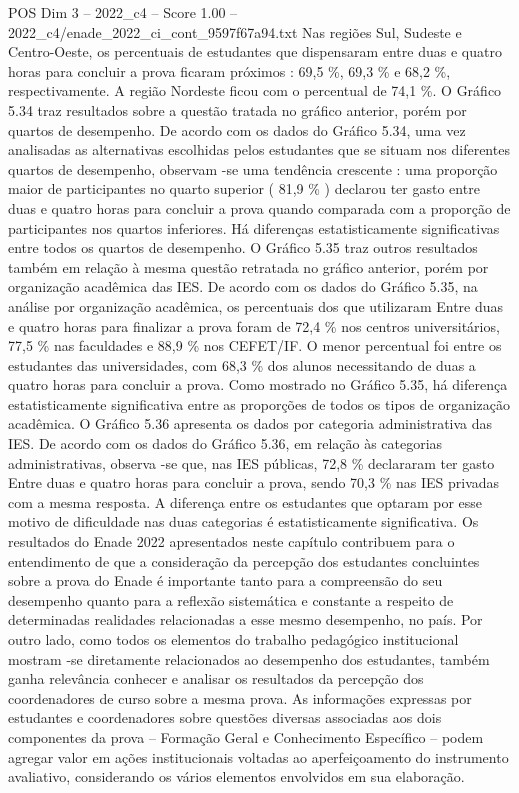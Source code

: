 \begin{textsample}{POS Dim 3 – 2022\_c4 – Score 1.00 – 2022\_c4/enade\_2022\_ci\_cont\_9597f67a94.txt}
Nas regiões Sul, Sudeste e Centro-Oeste, os percentuais de estudantes que dispensaram entre duas e quatro horas para concluir a prova ficaram próximos : 69,5 \%, 69,3 \% e 68,2 \%, respectivamente.
A região Nordeste ficou com o percentual de 74,1 \%.
O Gráfico 5.34 traz resultados sobre a questão tratada no gráfico anterior, porém por quartos de desempenho.
De acordo com os dados do Gráfico 5.34, uma vez analisadas as alternativas escolhidas pelos estudantes que se situam nos diferentes quartos de desempenho, observam -se uma tendência crescente : uma proporção maior de participantes no quarto superior ( 81,9 \% ) declarou ter gasto entre duas e quatro horas para concluir a prova quando comparada com a proporção de participantes nos quartos inferiores.
Há diferenças estatisticamente significativas entre todos os quartos de desempenho.
O Gráfico 5.35 traz outros resultados também em relação à mesma questão retratada no gráfico anterior, porém por organização acadêmica das IES.
De acordo com os dados do Gráfico 5.35, na análise por organização acadêmica, os percentuais dos que utilizaram Entre duas e quatro horas para finalizar a prova foram de 72,4 \% nos centros universitários, 77,5 \% nas faculdades e 88,9 \% nos CEFET/IF.
O menor percentual foi entre os estudantes das universidades, com 68,3 \% dos alunos necessitando de duas a quatro horas para concluir a prova.
Como mostrado no Gráfico 5.35, há diferença estatisticamente significativa entre as proporções de todos os tipos de organização acadêmica.
O Gráfico 5.36 apresenta os dados por categoria administrativa das IES.
De acordo com os dados do Gráfico 5.36, em relação às categorias administrativas, observa -se que, nas IES públicas, 72,8 \% declararam ter gasto Entre duas e quatro horas para concluir a prova, sendo 70,3 \% nas IES privadas com a mesma resposta.
A diferença entre os estudantes que optaram por esse motivo de dificuldade nas duas categorias é estatisticamente significativa.
Os resultados do Enade 2022 apresentados neste capítulo contribuem para o entendimento de que a consideração da percepção dos estudantes concluintes sobre a prova do Enade é importante tanto para a compreensão do seu desempenho quanto para a reflexão sistemática e constante a respeito de determinadas realidades relacionadas a esse mesmo desempenho, no país.
Por outro lado, como todos os elementos do trabalho pedagógico institucional mostram -se diretamente relacionados ao desempenho dos estudantes, também ganha relevância conhecer e analisar os resultados da percepção dos coordenadores de curso sobre a mesma prova.
As informações expressas por estudantes e coordenadores sobre questões diversas associadas aos dois componentes da prova – Formação Geral e Conhecimento Específico – podem agregar valor em ações institucionais voltadas ao aperfeiçoamento do instrumento avaliativo, considerando os vários elementos envolvidos em sua elaboração.

\end{textsample}
